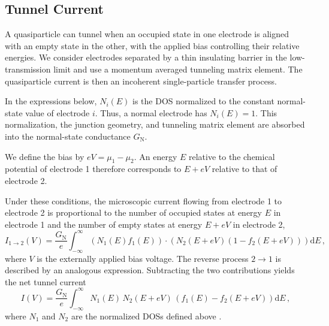     \subsection{Tunnel Current}
    \label{subsec:micro:tunnel-current}

        A quasiparticle can tunnel when an occupied state in one electrode is aligned with an empty state in the other, with the applied bias controlling their relative energies. We consider electrodes separated by a thin insulating barrier in the low-transmission limit and use a momentum averaged tunneling matrix element. The quasiparticle current is then an incoherent single-particle transfer process. \cite{bardeen_tunnelling_1961,giaever_electron_1960,giaever_study_1961}

        In the expressions below, $N_i(E)$ is the DOS normalized to the constant normal-state value of electrode $i$. Thus, a normal electrode has $N_i(E)=1$. This normalization, the junction geometry, and tunneling matrix element are absorbed into the normal-state conductance $G_\mathrm{N}$.

        We define the bias by $eV=\mu_1-\mu_2$. An energy $E$ relative to the chemical potential of electrode 1 therefore corresponds to $E+eV$ relative to that of electrode 2.

        Under these conditions, the microscopic current flowing from electrode 1 to electrode 2 is proportional to the number of occupied states at energy $E$ in electrode 1 and the number of empty states at energy $E+eV$ in electrode 2,
        \begin{equation}
            I_{1\to2}(V)  = \frac{G_\mathrm{N}}{e} \int_{-\infty}^\infty \left(N_1(E) f_1(E) \right)\cdot \left(N_2(E+eV)\left(1-f_2(E+eV)\right)\right)\mathrm{d}E\,,
            \label{eq:micro:tunnel-1to2}
        \end{equation}
        where $V$ is the externally applied bias voltage. The reverse process $2\to1$ is described by an analogous expression. Subtracting the two contributions yields the net tunnel current
        \begin{equation}
            I(V) = \frac{G_\mathrm{N}}{e} \int_{-\infty}^\infty N_1(E)\, N_2(E+eV)\, \left(f_1(E)-f_2(E+eV)\right)\mathrm{d}E\,,
            \label{eq:micro:tunnel}
        \end{equation}
        where $N_1$ and $N_2$ are the normalized DOSs defined above \cite{bardeen_tunnelling_1961,giaever_study_1961}.

